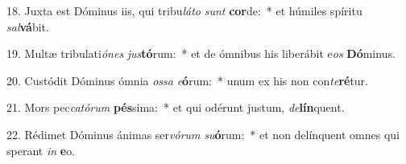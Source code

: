 18. Juxta est Dóminus iis, qui tribu\textit{lá}\textit{to} \textit{sunt} \textbf{cor}de:~*  et húmiles spíritu \textit{sal}\textbf{vá}bit.\

19. Multæ tribulati\textit{ó}\textit{nes} \textit{jus}\textbf{tó}rum:~*  et de ómnibus his liberábit e\textit{os} \textbf{Dó}minus.\

20. Custódit Dóminus ómnia \textit{os}\textit{sa} \textit{e}\textbf{ó}rum:~*  unum ex his non con\textit{te}\textbf{ré}tur.\

21. Mors pec\textit{ca}\textit{tó}\textit{rum} \textbf{pés}sima:~*  et qui odérunt justum, \textit{de}\textbf{lín}quent.\

22. Rédimet Dóminus ánimas ser\textit{vó}\textit{rum} \textit{su}\textbf{ó}rum:~*  et non delínquent omnes qui sperant \textit{in} \textbf{e}o.\

